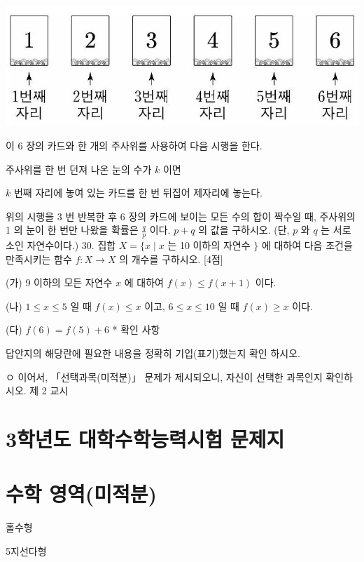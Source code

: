 \documentclass[10pt]{article}
\begin{document}
\begin{center}
\includegraphics[max width=\textwidth]{2023_05_19_a9cef858603f6abf5411g-12}
\end{center}

이 6 장의 카드와 한 개의 주사위를 사용하여 다음 시행을 한다.

주사위를 한 번 던져 나온 눈의 수가 $k$ 이면

$k$ 번째 자리에 놓여 있는 카드를 한 번 뒤집어 제자리에 놓는다.

위의 시행을 3 번 반복한 후 6 장의 카드에 보이는 모든 수의 합이 짝수일 때, 주사위의 1 의 눈이 한 번만 나왔을 확률은 $\frac{q}{p}$ 이다. $p+q$ 의 값을 구하시오. (단, $p$ 와 $q$ 는 서로소인 자연수이다.) 30. 집합 $X=\{x \mid x$ 는 10 이하의 자연수 $\}$ 에 대하여 다음 조건을 만족시키는 함수 $f: X \rightarrow X$ 의 개수를 구하시오. [4점]

(가) 9 이하의 모든 자연수 $x$ 에 대하여 $f(x) \leq f(x+1)$ 이다.

(나) $1 \leq x \leq 5$ 일 때 $f(x) \leq x$ 이고, $6 \leq x \leq 10$ 일 때 $f(x) \geq x$ 이다.

(다) $f(6)=f(5)+6$ * 확인 사항

답안지의 해당란에 필요한 내용을 정확히 기입(표기)했는지 확인 하시오.

ㅇ 이어서, 「선택과목(미적분)」 문제가 제시되오니, 자신이 선택한 과목인지 확인하시오. 제 2 교시

\section{3학년도 대학수학능력시험 문제지}
\section{수학 영역(미적분)}
홀수형

5지선다형
\end{document}
